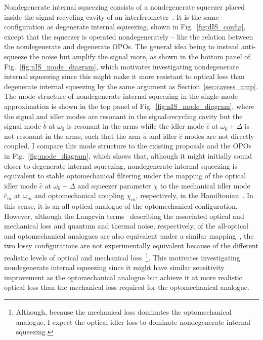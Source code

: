 Nondegenerate internal squeezing consists of a nondegenerate squeezer placed inside the signal-recycling cavity of an interferometer~\cite{}. It is the same configuration as degenerate internal squeezing, shown in Fig.~\ref{fig:dIS_config}, except that the squeezer is operated nondegenerately -- like the relation between the nondegenerate and degenerate OPOs. The general idea being to instead anti-squeeze the noise but amplify the signal more, as shown in the bottom panel of Fig.~\ref{fig:nIS_mode_diagram}, which motivates investigating nondegenerate internal squeezing since this might make it more resistant to optical loss than degenerate internal squeezing by the same argument as Section~\ref{sec:cavess_amp}. %
The mode structure of nondegenerate internal squeezing in the single-mode approximation is shown in the top panel of Fig.~\ref{fig:nIS_mode_diagram}, where the signal and idler modes are resonant in the signal-recycling cavity but the signal mode $\hat b$ at $\omega_0$ is resonant in the arms while the idler mode $\hat c$ at $\omega_0+\Delta$ is not resonant in the arms, such that the arm $\hat a$ and idler $\hat c$ modes are not directly coupled. I compare this mode structure to the existing proposals and the OPOs in Fig.~\ref{fig:mode_diagram}, which shows that, although it might initially sound closer to degenerate internal squeezing, nondegenerate internal squeezing is equivalent to stable optomechanical filtering under the mapping of the optical idler mode $\hat c$ at $\omega_0+\Delta$ and squeezer parameter $\chi$ to the mechanical idler mode $\hat{c}_m$ at $\omega_m$  and optomechanical coupling $\chi_m$, respectively, in the Hamiltonian~\cite{Li2020}. In this sense, it is an all-optical analogue of the optomechanical configuration.
However, although the Langevin terms~\cite{} describing the associated optical and mechanical loss and quantum and thermal noise, respectively, of the all-optical and optomechanical analogues are also equivalent under a similar mapping~\cite{}, the two lossy configurations are not experimentally equivalent because of the different realistic levels of optical and mechanical loss~\footnote{Although, because the mechanical loss dominates the optomechanical analogue, I expect the optical idler loss to dominate nondegenerate internal squeezing.}. This motivates investigating nondegenerate internal squeezing since it might have similar sensitivity improvement as the optomechanical analogue but achieve it at more realistic optical loss than the mechanical loss required for the optomechanical analogue.

